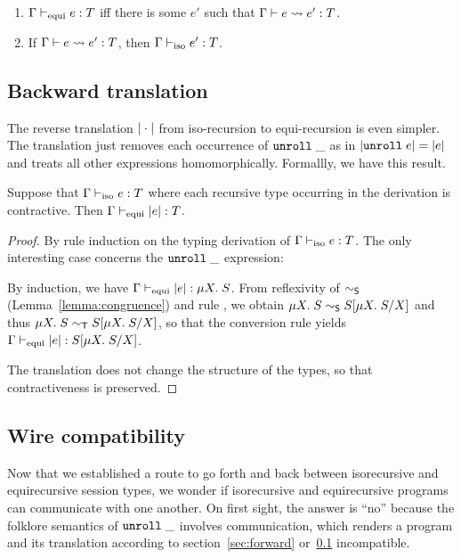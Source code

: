 \begin{lemma}
  \begin{enumerate}
  \item $\typing{\tyEqui e} T$ iff there is some $e'$ such that
    $\translation e {e'} T$.
  \item If $\translation e {e'} T$, then $\typing{\tyIso e'} T$.
  \end{enumerate}
\end{lemma}

\subsection{Backward translation}
\label{sec:backward-translation}

The reverse translation $\IsoToEqui\cdot$ from iso-recursion to equi-recursion is even
simpler. The translation just removes each occurrence of $\EUnroll\_$
as in $\IsoToEqui{\EUnroll e} = \IsoToEqui e$ and treats all other
expressions homomorphically. Formallly, we have this result.
\begin{lemma}
  Suppose that $\typing{\tyIso e}T$ where each recursive type
  occurring in the derivation is contractive.
  Then $\typing{\tyEqui \IsoToEqui{e}}T$.
\end{lemma}
\begin{proof}
  By rule induction on the typing derivation of  $\typing{\tyIso
    e}T$. The only interesting case concerns the $\EUnroll\_$
  expression:
  \begin{mathpar}
  \end{mathpar}
  By induction, we have $\typing{\tyEqui \IsoToEqui{e}}{\TRec S}$.
  From reflexivity of $\eqs$ (Lemma~\ref{lemma:congruence}) and rule
  {\EqUnrollL}, we obtain $\TRec S 
  \eqs S[\TRec[X] S / X]$ and thus  $\TRec S 
  \eqt S[\TRec[X] S / X]$, so that the conversion rule yields
  $\typing{\tyEqui \IsoToEqui{e}}{S[\TRec[X] S / X]}$.

  The translation does not change the structure of the types, so that
  contractiveness is preserved.
\end{proof}

\subsection{Wire compatibility}
\label{sec:wire-compatibility}

Now that we established a route to go forth and back between
isorecursive and equirecursive session types, we wonder if
isorecursive and equirecursive programs can communicate with one
another. On first sight, the answer is ``no'' because the folklore
semantics of $\EUnroll\_$ involves communication, which renders a
program and its translation according to section~\ref{sec:forward}
or~\ref{sec:backward-translation} incompatible.

